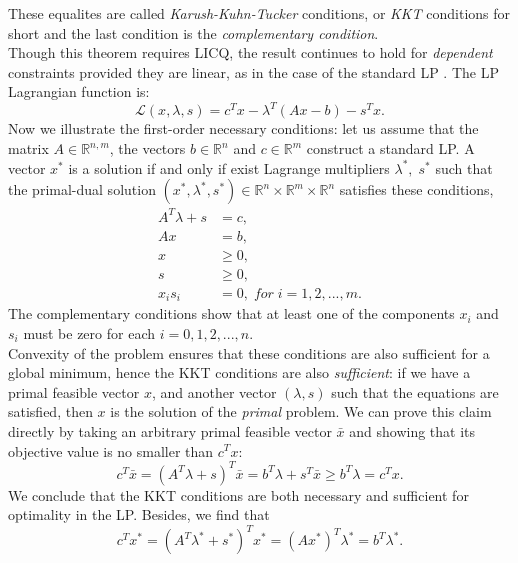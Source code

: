 \documentclass[a4paper,10 pt,titlepage,twoside]{book}
\theoremstyle{plain}
\theoremstyle{definition}
\theoremstyle{remark}
\begin{document}
These equalites are called \textit{Karush-Kuhn-Tucker} conditions, or \textit{KKT} conditions for short and the last condition is the \textit{complementary condition}.\\ Though this theorem requires LICQ, the result continues to hold for \textit{dependent} constraints provided they are linear, as in the case of the standard LP \cite{W}. The LP Lagrangian function is:\\
\begin{equation}
\mathcal{L}(x,\lambda,s)=c^{T}x-\lambda^{T}\left(Ax-b\right)-s^{T}x.
\end{equation}
Now we illustrate the first-order necessary conditions: let us assume that the matrix $A\in\mathbb{R}^{n,m}$, the vectors $b\in\mathbb{R}^{n}$ and $c\in\mathbb{R}^{m}$ construct a standard LP. A vector $x^{*}$ is a solution if and only if exist Lagrange multipliers $\lambda^{*},\;s^{*}$ such that the primal-dual solution $\left( x^{*},\lambda^{*},s^{*}\right)\in\mathbb{R}^{n}\times\mathbb{R}^{m}\times\mathbb{R}^{n}$ satisfies these conditions, 
\begin{align}
A^{T}\lambda+s&=c,\\ \label{DF}
Ax&=b,\\ \label{PF}
x&\geq 0,\\
s&\geq 0,\\
x_{i}s_{i}&=0,\; for\;i= 1,2,...,m. \label{CC}
\end{align} 
The complementary conditions show that at least one of the components $x_{i}$ and $s_{i}$ must be zero for each $i=0,1,2,...,n$.\\
 Convexity of the problem ensures that these conditions are also sufficient for a global minimum, hence the KKT conditions are also \textit{sufficient}: if we have a primal feasible vector $x$, and another vector $(\lambda, s)$ such that the equations are satisfied, then $x$ is the solution of the \textit{primal} problem. We can prove this claim directly by taking an arbitrary primal feasible vector $\bar{x}$ and showing that its objective value is no smaller than $c^{T}x$:
\begin{equation*}
c^{T}\bar{x}=(A^{T}\lambda+s)^{T}\bar{x}=b^{T}\lambda+s^{T}\bar{x}\geq b^{T}\lambda= c^{T}x.
\end{equation*}
We conclude that the KKT conditions are both necessary and sufficient for optimality in the LP. Besides, we find that
\begin{equation*}
	c^{T}x^{*}=\left(A^{T}\lambda^{*}+s^{*}\right)^{T}x^{*}=\left(Ax^{*}\right)^{T}\lambda^{*}=b^{T}\lambda^{*}.
\end{equation*}
\end{document}
